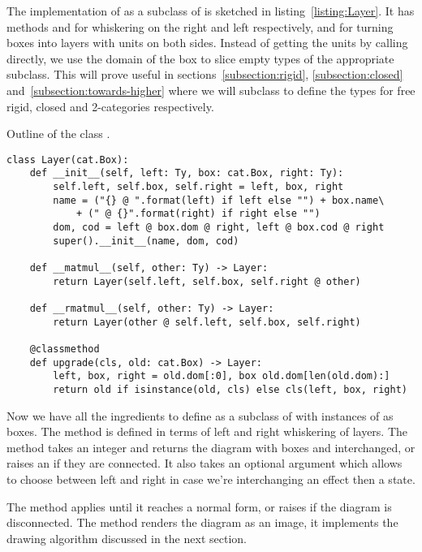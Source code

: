 The implementation of  as a subclass of  is sketched in listing~\ref{listing:Layer}.
It has methods  and   for whiskering on the right and left respectively, and  for turning boxes into layers with units on both sides.
Instead of getting the units by calling  directly, we use the domain of the box to slice empty types of the appropriate  subclass.
This will prove useful in sections~\ref{subsection:rigid}, \ref{subsection:closed} and~\ref{subsection:towards-higher} where we will subclass  to define the types for free rigid, closed and 2-categories respectively.

\begin{python}\label{listing:Layer}
{\normalfont Outline of the class .}

\begin{verbatim}
class Layer(cat.Box):
    def __init__(self, left: Ty, box: cat.Box, right: Ty):
        self.left, self.box, self.right = left, box, right
        name = ("{} @ ".format(left) if left else "") + box.name\
            + (" @ {}".format(right) if right else "")
        dom, cod = left @ box.dom @ right, left @ box.cod @ right
        super().__init__(name, dom, cod)

    def __matmul__(self, other: Ty) -> Layer:
        return Layer(self.left, self.box, self.right @ other)

    def __rmatmul__(self, other: Ty) -> Layer:
        return Layer(other @ self.left, self.box, self.right)

    @classmethod
    def upgrade(cls, old: cat.Box) -> Layer:
        left, box, right = old.dom[:0], box old.dom[len(old.dom):]
        return old if isinstance(old, cls) else cls(left, box, right)
\end{verbatim}
\end{python}

Now we have all the ingredients to define  as a subclass of  with instances of  as boxes.
The \py{tensor} method is defined in terms of left and right whiskering of layers.
The \py{interchange} method takes an integer \py{i < len(self)} and returns the diagram with boxes  and  interchanged, or raises an  if they are connected.
It also takes an optional argument \py{left: bool} which allows to choose between left and right in case we're interchanging an effect then a state.

The  method applies  until it reaches a normal form, or raises  if the diagram is disconnected.
The \py{draw} method renders the diagram as an image, it implements the drawing algorithm discussed in the next section.

